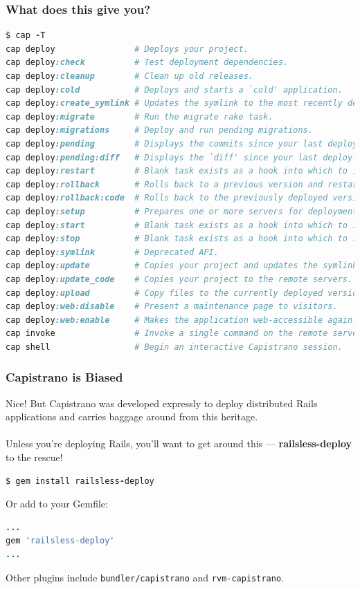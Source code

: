 \documentclass[t,handout]{beamer}
\begin{document}
\begin{frame}[fragile]
\frametitle{What does this give you?}
\begin{lstlisting}[frame=none,language=Ruby,basicstyle=\tiny\ttfamily\color{black},commentstyle=\tiny\ttfamily\color{red}]
$ cap -T
cap deploy                # Deploys your project.
cap deploy:check          # Test deployment dependencies.
cap deploy:cleanup        # Clean up old releases.
cap deploy:cold           # Deploys and starts a `cold' application.
cap deploy:create_symlink # Updates the symlink to the most recently deployed...
cap deploy:migrate        # Run the migrate rake task.
cap deploy:migrations     # Deploy and run pending migrations.
cap deploy:pending        # Displays the commits since your last deploy.
cap deploy:pending:diff   # Displays the `diff' since your last deploy.
cap deploy:restart        # Blank task exists as a hook into which to install...
cap deploy:rollback       # Rolls back to a previous version and restarts.
cap deploy:rollback:code  # Rolls back to the previously deployed version.
cap deploy:setup          # Prepares one or more servers for deployment.
cap deploy:start          # Blank task exists as a hook into which to install...
cap deploy:stop           # Blank task exists as a hook into which to install...
cap deploy:symlink        # Deprecated API.
cap deploy:update         # Copies your project and updates the symlink.
cap deploy:update_code    # Copies your project to the remote servers.
cap deploy:upload         # Copy files to the currently deployed version.
cap deploy:web:disable    # Present a maintenance page to visitors.
cap deploy:web:enable     # Makes the application web-accessible again.
cap invoke                # Invoke a single command on the remote servers.
cap shell                 # Begin an interactive Capistrano session.
\end{lstlisting}
\end{frame}

\begin{frame}[fragile]
\frametitle{Capistrano is Biased}
Nice! But Capistrano was developed expressly to deploy distributed Rails applications and carries baggage around from this heritage.\\~\\

Unless you're deploying Rails, you'll want to get around this --- {\bf railsless-deploy} to the rescue!
\begin{lstlisting}[frame=none,language=Ruby,basicstyle=\scriptsize\ttfamily\color{black},commentstyle=\tiny\ttfamily\color{red}]
$ gem install railsless-deploy
\end{lstlisting}
Or add to your Gemfile:
\begin{lstlisting}[frame=none,language=Ruby,basicstyle=\scriptsize\ttfamily\color{black},commentstyle=\tiny\ttfamily\color{red}]
...
gem 'railsless-deploy'
...
\end{lstlisting}
Other plugins include {\small\tt bundler/capistrano} and {\small\tt rvm-capistrano}.
\end{frame}
\end{document}
